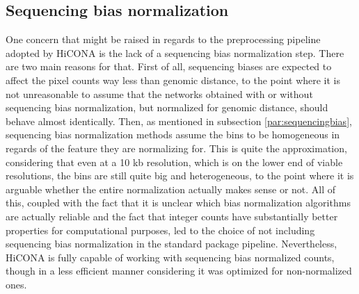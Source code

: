 \subsection{Sequencing bias normalization}
One concern that might be raised in regards to the preprocessing pipeline adopted by HiCONA is the lack of a sequencing bias normalization step. There are two main reasons for that. First of all, sequencing biases are expected to affect the pixel counts way less than genomic distance, to the point where it is not unreasonable to assume that the networks obtained with or without sequencing bias normalization, but normalized for genomic distance, should behave almost identically. Then, as mentioned in subsection \ref{par:sequencingbias}, sequencing bias normalization methods assume the bins to be homogeneous in regards of the feature they are normalizing for. This is quite the approximation, considering that even at a 10 kb resolution, which is on the lower end of viable resolutions, the bins are still quite big and heterogeneous, to the point where it is arguable whether the entire normalization actually makes sense or not. All of this, coupled with the fact that it is unclear which bias normalization algorithms are actually reliable and the fact that integer counts have substantially better properties for computational purposes, led to the choice of not including sequencing bias normalization in the standard package pipeline. Nevertheless, 
HiCONA is fully capable of working with sequencing bias normalized counts, though in a less efficient manner considering it was optimized for non-normalized ones.

